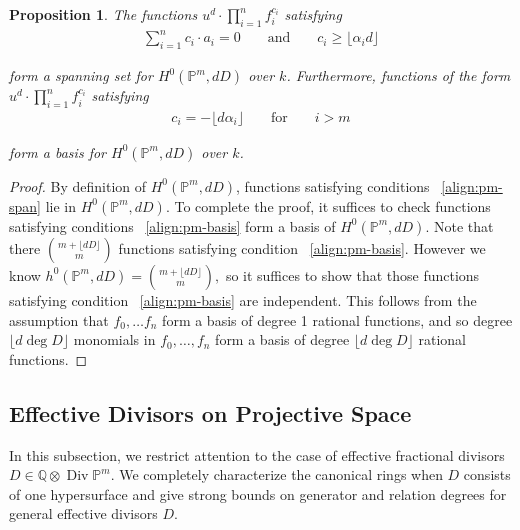 \documentclass{amsart}
\theoremstyle{plain}
\newtheorem{prop}[thm]{Proposition}
\theoremstyle{definition}
\theoremstyle{remark}
\numberwithin{equation}{section}
\newcommand\ssec{\subsection}
\newcommand\bq{{\mathbb Q}}
\newcommand\bp{{\mathbb P}}
\DeclareMathOperator\di{Div}
\newcommand\bida{a}
\begin{document}
\begin{prop}
\label{prop:pm-span-and-basis}
The functions $u^d \cdot \prod_{i=1}^n f_i^{c_i}$ satisfying 
\begin{align}
\label{align:pm-span}
\sum_{i=1}^{n} c_i \cdot \bida_i = 0 && \text{ and } &&c_i \geq \lfloor \alpha_i d\rfloor	
\end{align}

\noindent
form a spanning set for $H^0(\bp^m, dD)$ over $k$. Furthermore, functions 
of the form $u^d \cdot \prod_{i=1}^n f_i^{c_i}$ satisfying
\begin{align}
\label{align:pm-basis}
c_i = -\lfloor d\alpha_i \rfloor && \text{ for } && i > m
\end{align}

\noindent
form a basis for $H^0(\bp^m, dD)$ over $k$.
\end{prop}

\begin{proof}
By definition of $H^0(\bp^m,dD)$, functions satisfying conditions 
~\eqref{align:pm-span} lie in $H^0(\bp^m,dD)$. To complete the proof, it
suffices to check functions satisfying conditions ~\eqref{align:pm-basis} form
a basis of $H^0(\bp^m,dD)$. Note that there $\binom{m+ \lfloor dD \rfloor }{m}$
functions satisfying condition ~\eqref{align:pm-basis}. However we know
$h^0(\bp^m,dD) = \binom{m+ \lfloor dD \rfloor }{m},$ so it suffices to show
that those functions satisfying condition ~\eqref{align:pm-basis} are
independent. This follows from the assumption that $f_0,\ldots f_n$ form a
basis of degree 1 rational functions, and so degree $\lfloor d \deg D \rfloor $
monomials in $f_0,\ldots, f_n$ form a basis of degree $\lfloor d \deg D \rfloor
$ rational functions.
\end{proof}

\ssec{Effective Divisors on Projective Space}
\label{ssec:proj-one-point}

In this subsection, we restrict attention to the case of effective
fractional divisors $D \in \bq \otimes \di \bp^m$. We completely
characterize the canonical rings when $D$ consists of one
hypersurface and give strong  bounds on generator and relation
degrees for general effective divisors $D$.
\end{document}
